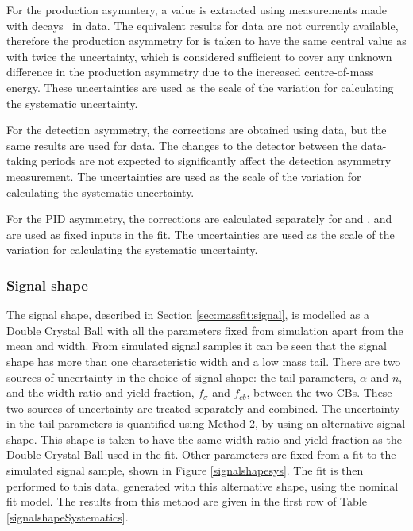 For the production asymmtery, a \runone value is extracted using measurements made with \decay{\Bp}{\Dzb\pip} decays~\cite{LHCb-PAPER-2016-054} in data. The equivalent results for \runtwo data are not currently available, therefore the production asymmetry for \runtwo is taken to have the same central value as \runone with twice the uncertainty, which is considered sufficient to cover any unknown difference in the production asymmetry due to the increased centre-of-mass energy. These uncertainties are used as the scale of the variation for calculating the systematic uncertainty.

For the detection asymmetry, the corrections are obtained using \runone data, but the same results are used for \runtwo data. The changes to the detector between the data-taking periods are not expected to significantly affect the detection asymmetry measurement. The uncertainties are used as the scale of the variation for calculating the systematic uncertainty.

For the PID asymmetry, the corrections are calculated separately for \runone and \runtwo, and are used as fixed inputs in the \CP fit. The uncertainties are used as the scale of the variation for calculating the systematic uncertainty.

\subsubsection{Signal shape}
\label{sec:systematics:signal}

The signal shape, described in Section \ref{sec:massfit:signal}, is modelled as a Double Crystal Ball with all the parameters fixed from simulation apart from the mean and width. From simulated signal samples it can be seen that the signal shape has more than one characteristic width and a low mass tail. There are two sources of uncertainty in the choice of signal shape: the tail parameters, $\alpha$ and $n$, and the width ratio and yield fraction, $f_{\sigma}$ and $f_{cb}$, between the two CBs. These two sources of uncertainty are treated separately and combined. The uncertainty in the tail parameters is quantified using Method 2, by using an alternative signal shape. This shape is taken to have the same width ratio and yield fraction as the Double Crystal Ball used in the \CP fit. Other parameters are fixed from a fit to the simulated signal sample, shown in Figure \ref{signalshapesys}. The \CP fit is then performed to this data, generated with this alternative shape, using the nominal fit model.  The results from this method are given in the first row of Table \ref{signalshapeSystematics}.

